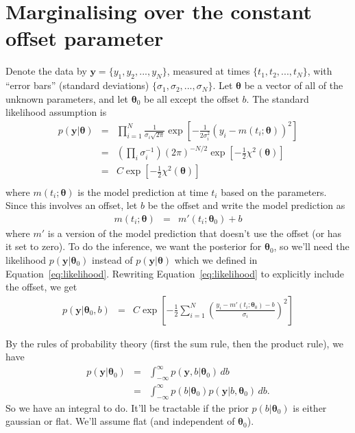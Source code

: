 \documentclass[a4paper, 11pt]{article}
\title{}
\author{}
\newcommand{\yy}{\boldsymbol{y}}	%
\newcommand{\btheta}{\boldsymbol{\theta}}  %
\begin{document}

\section{Marginalising over the constant offset parameter}
Denote the data by $\yy = \{y_1, y_2, ..., y_N\}$, measured at times
$\{t_1, t_2, ..., t_N\}$, with ``error bars'' (standard deviations)
$\{\sigma_1, \sigma_2, ..., \sigma_N\}$. Let
$\btheta$ be a vector of all of the unknown parameters,
and let $\btheta_0$ be all except the offset $b$.
The standard likelihood assumption is
\begin{eqnarray}
p(\yy | \btheta) &=& \prod_{i=1}^N \frac{1}{\sigma_i\sqrt{2\pi}}
\exp\left[
-\frac{1}{2\sigma_i^2}
\left(y_i - m(t_i ;\btheta)
\right)^2
\right]\label{eq:likelihood}\\
&=&
\left(\prod_i \sigma_i^{-1}\right)(2\pi)^{-N/2}
\exp\left[-\frac{1}{2}\chi^2(\btheta)\right]\\
&=&
C
\exp\left[-\frac{1}{2}\chi^2(\btheta)\right]\\
\end{eqnarray}
where $m(t_i; \btheta)$ is the model prediction at time $t_i$ based on the
parameters. Since this involves an offset, let $b$ be the offset and write
the model prediction as
\begin{eqnarray}
m(t_i; \btheta) &=& m'(t_i; \btheta_0) + b
\end{eqnarray}
where $m'$ is a version of the model prediction that doesn't use the offset
(or has it set to zero). To do the inference, we want the posterior for
$\btheta_0$, so we'll need the likelihood $p(\yy | \btheta_0)$ instead of
$p(\yy | \btheta)$ which we defined in Equation~\ref{eq:likelihood}.
Rewriting Equation~\ref{eq:likelihood} to explicitly include the offset, we
get
\begin{eqnarray}
p(\yy | \btheta_0, b) &=& C
\exp\left[
-\frac{1}{2}\sum_{i=1}^N
\left(\frac{y_i - m'(t_i; \btheta_0) - b}{\sigma_i}
\right)^2
\right]
\end{eqnarray}

By the rules of probability theory (first the sum rule, then the product rule),
we have
\begin{eqnarray}
p(\yy | \btheta_0) &=& \int_{-\infty}^\infty p(\yy, b | \btheta_0) \, db\\
&=& \int_{-\infty}^\infty p(b | \btheta_0)p(\yy | b, \btheta_0) \, db.
\label{eq:integral}
\end{eqnarray}
So we have an integral to do. It'll be tractable if the prior $p(b | \btheta_0)$
is either gaussian or flat. We'll assume flat (and independent of $\btheta_0$).
\end{document}
